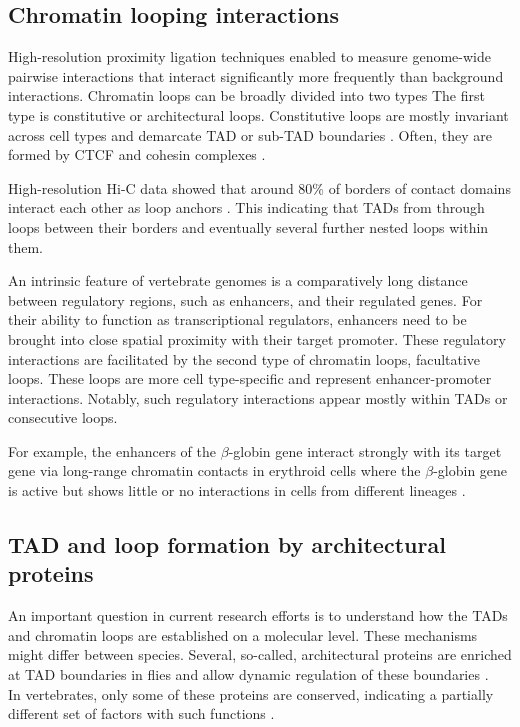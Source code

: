 \documentclass[a4paper,twoside=true,openright,parskip=full,chapterprefix=true,11pt,headings=normal,bibliography=totoc,listof=totoc,titlepage=on,captions=tableabove,draft=false]{scrreprt}
\theoremstyle{definition}
\theoremstyle{definition}
\theoremstyle{definition}
\theoremstyle{remark}
\begin{document}
\hypertarget{chromatin-looping-interactions}{%
\subsection{Chromatin looping
interactions}\label{chromatin-looping-interactions}}

High-resolution proximity ligation techniques enabled to measure
genome-wide pairwise interactions that interact significantly more
frequently than background interactions. Chromatin loops can be broadly
divided into two types \citep{Yu2017, Andrey2017} The first type is
constitutive or architectural loops. Constitutive loops are mostly
invariant across cell types and demarcate TAD or sub-TAD boundaries
\citep{Dowen2014, Ji2016, Phillips-Cremins2013}. Often, they are formed
by CTCF and cohesin complexes \citep{Rao2014}.

High-resolution Hi-C data showed that around 80\% of borders of contact
domains interact each other as loop anchors \citep{Rao2014}. This
indicating that TADs from through loops between their borders and
eventually several further nested loops within them.

An intrinsic feature of vertebrate genomes is a comparatively long
distance between regulatory regions, such as enhancers, and their
regulated genes. For their ability to function as transcriptional
regulators, enhancers need to be brought into close spatial proximity
with their target promoter. These regulatory interactions are
facilitated by the second type of chromatin loops, facultative loops.
These loops are more cell type-specific and represent enhancer-promoter
interactions. Notably, such regulatory interactions appear mostly within
TADs or consecutive loops.

For example, the enhancers of the \(\beta\)-globin gene interact
strongly with its target gene via long-range chromatin contacts in
erythroid cells where the \(\beta\)-globin gene is active but shows
little or no interactions in cells from different lineages
\citep{Palstra2003}.

\hypertarget{loop-mechanism}{%
\subsection{TAD and loop formation by architectural
proteins}\label{loop-mechanism}}

An important question in current research efforts is to understand how
the TADs and chromatin loops are established on a molecular level. These
mechanisms might differ between species. Several, so-called,
architectural proteins are enriched at TAD boundaries in flies and allow
dynamic regulation of these boundaries
\citep{Bortle2014, Gomez-Diaz2014}.\\
In vertebrates, only some of these proteins are conserved, indicating a
partially different set of factors with such functions
\citep{Phillips-Cremins2013, Bonev2016}.
\end{document}
